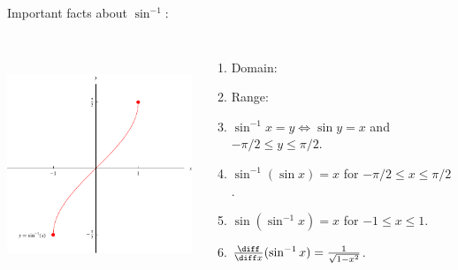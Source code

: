 \begin{frame}
Important facts about $\sin^{-1}$:
\begin{columns}[c]
\ \includegraphics[height=6cm]{inverse-trig/pictures/07-06-arcsine.pdf}%
\begin{enumerate}
\item  \alert<handout:0| 2-3>{Domain: }
\item  \alert<handout:0| 4-5>{Range: }
\item  $\sin^{-1} x = y \Leftrightarrow \sin y = x$ and $-\pi /2 \leq y \leq \pi /2$.
\item  $\sin^{-1} (\sin x) = x$ for $-\pi /2 \leq x \leq \pi /2$.
\item  $\sin (\sin^{-1} x) = x$ for $-1 \leq x \leq 1$.
\item  $\frac{\diff}{\diff x} (\sin^{-1} x) = \frac{1}{\sqrt{1-x^2}}$.
\end{enumerate}
\end{columns}
\end{frame}
